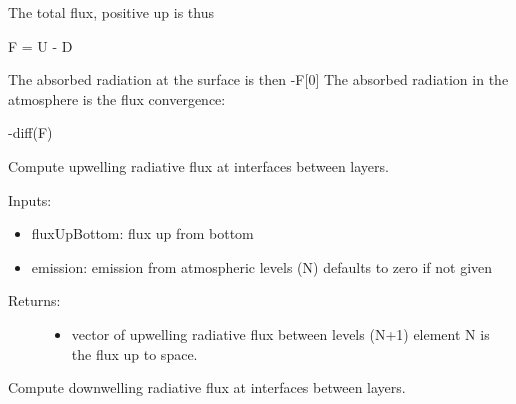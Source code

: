 \documentclass[letterpaper,10pt,english]{sphinxmanual}
\begin{document}
\begin{fulllineitems}
The total flux, positive up is thus

F = U - D

The absorbed radiation at the surface is then -F{[}0{]}
The absorbed radiation in the atmosphere is the flux convergence:

-diff(F)

\begin{fulllineitems}
\label{api/climlab.radiation:climlab.radiation.transmissivity.Transmissivity.flux_down}
Compute upwelling radiative flux at interfaces between layers.

Inputs:
\begin{itemize}
\item {} 
fluxUpBottom: flux up from bottom

\item {} 
emission: emission from atmospheric levels (N)
defaults to zero if not given

\end{itemize}
\begin{description}
\item[{Returns:}] \leavevmode\begin{itemize}
\item {} 
vector of upwelling radiative flux between levels (N+1)
element N is the flux up to space.

\end{itemize}

\end{description}

\end{fulllineitems}


\begin{fulllineitems}
\label{api/climlab.radiation:climlab.radiation.transmissivity.Transmissivity.flux_reflected_up}
\end{fulllineitems}


\begin{fulllineitems}
\label{api/climlab.radiation:climlab.radiation.transmissivity.Transmissivity.flux_up}
Compute downwelling radiative flux at interfaces between layers.


\end{fulllineitems}
\end{fulllineitems}
\end{document}
